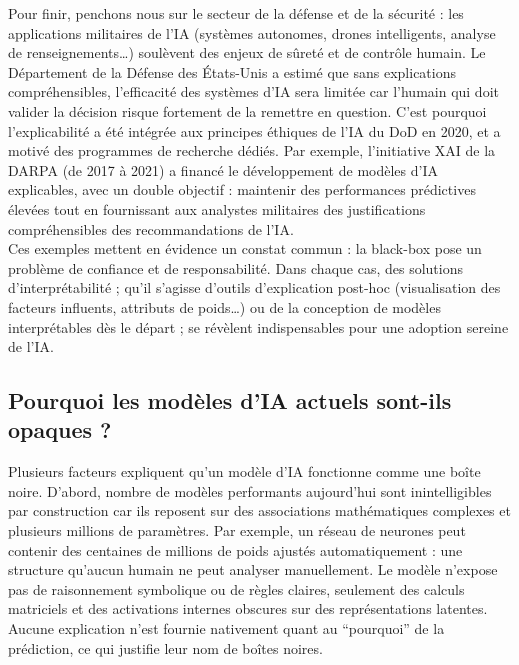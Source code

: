 \documentclass{article}
\begin{document}
Pour finir, penchons nous sur le secteur de la défense et de la sécurité : les applications militaires de l’IA (systèmes autonomes, drones intelligents, analyse de renseignements…) soulèvent des enjeux de sûreté et de contrôle humain. Le Département de la Défense des États-Unis a estimé que sans explications compréhensibles, l’efficacité des systèmes d’IA sera limitée car l’humain qui doit valider la décision risque fortement de la remettre en question. C’est pourquoi l’explicabilité a été intégrée aux principes éthiques de l’IA du DoD en 2020, et a motivé des programmes de recherche dédiés. Par exemple, l’initiative XAI de la DARPA (de 2017 à 2021) a financé le développement de modèles d’IA explicables, avec un double objectif : maintenir des performances prédictives élevées tout en fournissant aux analystes militaires des justifications compréhensibles des recommandations de l’IA.\\

Ces exemples mettent en évidence un constat commun : la black-box pose un problème de confiance et de responsabilité. Dans chaque cas, des solutions d’interprétabilité ; qu’il s’agisse d’outils d’explication post-hoc (visualisation des facteurs influents, attributs de poids…) ou de la conception de modèles interprétables dès le départ ; se révèlent indispensables pour une adoption sereine de l’IA.

\subsection{Pourquoi les modèles d’IA actuels sont-ils opaques ?}

\quad Plusieurs facteurs expliquent qu’un modèle d’IA fonctionne comme une boîte noire. D’abord, nombre de modèles performants aujourd’hui sont inintelligibles par construction car ils reposent sur des associations mathématiques complexes et plusieurs millions de paramètres. Par exemple, un réseau de neurones peut contenir des centaines de millions de poids ajustés automatiquement : une structure qu’aucun humain ne peut analyser manuellement. Le modèle n’expose pas de raisonnement symbolique ou de règles claires, seulement des calculs matriciels et des activations internes obscures sur des représentations latentes. Aucune explication n’est fournie nativement quant au “pourquoi” de la prédiction, ce qui justifie leur nom de boîtes noires.\\
\end{document}
